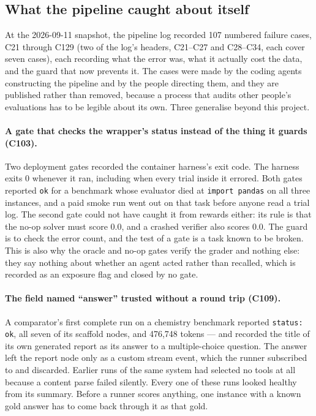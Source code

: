 \subsection{What the pipeline caught about itself}
\label{sec:selfaudit}

At the 2026-09-11 snapshot, the pipeline log recorded 107 numbered failure
cases, C21 through C129 (two of the log's headers, C21--C27 and C28--C34, each cover seven cases),
each recording what the error was, what it actually cost the data, and the guard that now prevents
it. The cases were made by the coding agents constructing the pipeline and by the people directing
them, and they are published rather than removed, because a process that audits other people's
evaluations has to be legible about its own. Three generalise beyond this project.

\paragraph{A gate that checks the wrapper's status instead of the thing it guards (C103).}
Two deployment gates recorded the container harness's exit code. The harness exits 0 whenever it
ran, including when every trial inside it errored. Both gates reported \texttt{ok} for a benchmark
whose evaluator died at \texttt{import pandas} on all three instances, and a paid smoke run went
out on that task before anyone read a trial log. The second gate could not have caught it from
rewards either: its rule is that the no-op solver must score 0.0, and a crashed verifier also
scores 0.0. The guard is to check the error count, and the test of a gate is a task known to be
broken. This is also why the oracle and no-op gates verify the grader and nothing else: they say
nothing about whether an agent acted rather than recalled, which is recorded as an exposure flag
and closed by no gate.

\paragraph{The field named ``answer'' trusted without a round trip (C109).}
A comparator's first complete run on a chemistry benchmark reported \texttt{status: ok}, all seven
of its scaffold nodes, and 476{,}748 tokens --- and recorded the title of its own generated report
as its answer to a multiple-choice question. The answer left the report node only as a custom
stream event, which the runner subscribed to and discarded. Earlier runs of the same system had
selected no tools at all because a content parse failed silently. Every one of these runs looked
healthy from its summary. Before a runner scores anything, one instance with a known gold answer
has to come back through it as that gold.

